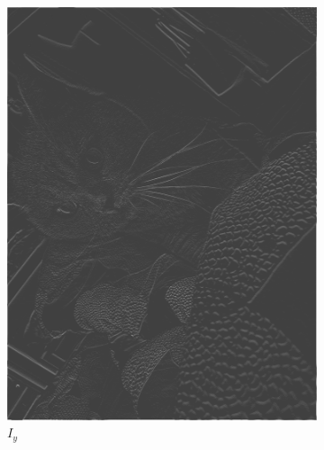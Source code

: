 \begin{frame}
\begin{figure}
\begin{subfigure}[b]{0.175\textwidth}
			\includegraphics[width=\textwidth]{images/KadseSimpleY}
			\caption[]%
			{{\small $I_y$}}    
			\label{fig:FelixY}
		\end{subfigure}
		\quad
		\begin{subfigure}[b]{0.175\textwidth}   
			\centering 

\end{subfigure}
\end{figure}
\end{frame}
